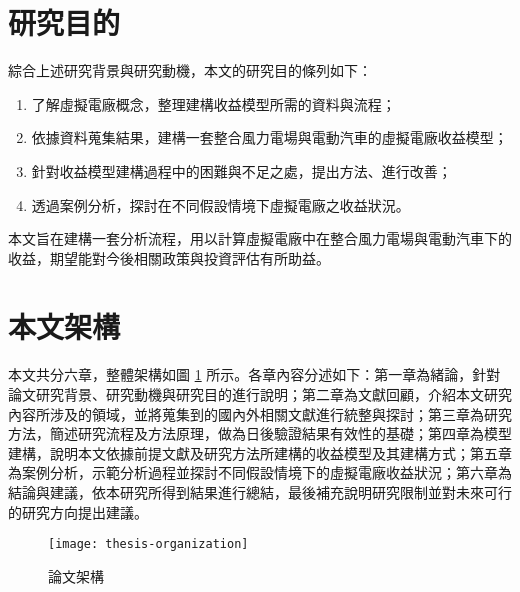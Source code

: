 \section{研究目的}

綜合上述研究背景與研究動機，本文的研究目的條列如下：

\begin{enumerate}[label = (\arabic*), itemsep=4pt, parsep=4pt, topsep=0pt, partopsep=0pt]
  \item 了解虛擬電廠概念，整理建構收益模型所需的資料與流程；
  \item 依據資料蒐集結果，建構一套整合風力電場與電動汽車的虛擬電廠收益模型；
  \item 針對收益模型建構過程中的困難與不足之處，提出方法、進行改善；
  \item 透過案例分析，探討在不同假設情境下虛擬電廠之收益狀況。
\end{enumerate}

本文旨在建構一套分析流程，用以計算虛擬電廠中在整合風力電場與電動汽車下的收益，期望能對今後相關政策與投資評估有所助益。


\section{本文架構}

本文共分六章，整體架構如圖 \ref{figure: Thesis Organization} 所示。各章內容分述如下：第一章為緒論，針對論文研究背景、研究動機與研究目的進行說明；第二章為文獻回顧，介紹本文研究內容所涉及的領域，並將蒐集到的國內外相關文獻進行統整與探討；第三章為研究方法，簡述研究流程及方法原理，做為日後驗證結果有效性的基礎；第四章為模型建構，說明本文依據前提文獻及研究方法所建構的收益模型及其建構方式；第五章為案例分析，示範分析過程並探討不同假設情境下的虛擬電廠收益狀況；第六章為結論與建議，依本研究所得到結果進行總結，最後補充說明研究限制並對未來可行的研究方向提出建議。

\begin{figure}[htbp]
  \centering
  \texttt{[image: thesis-organization]}
  \caption[論文架構]{論文架構}
  \label{figure: Thesis Organization}
\end{figure}